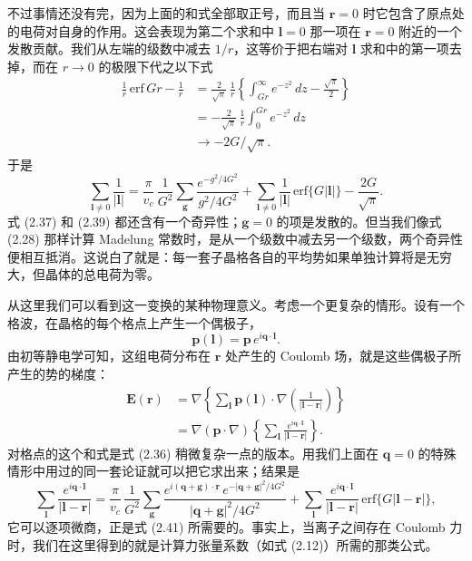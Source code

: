 不过事情还没有完，因为上面的和式全部取正号，而且当 $\mathbf{r}=0$ 时它包含了原点处的电荷对自身的作用。这会表现为第二个求和中 $\boldsymbol{l}=0$ 那一项在 $\mathbf{r}=0$ 附近的一个发散贡献。我们从左端的级数中减去 $1/r$，这等价于把右端对 $\boldsymbol{l}$ 求和中的第一项去掉，而在 $r\to 0$ 的极限下代之以下式
\begin{align*}
\frac{1}{r}\,\mathrm{erf}\,Gr - \frac{1}{r} &= \frac{2}{\sqrt{\pi}}\,\frac{1}{r}\left\{\int_{Gr}^{\infty} e^{-z^2}\, dz - \frac{\sqrt{\pi}}{2}\right\} \\
&= -\frac{2}{\sqrt{\pi}}\,\frac{1}{r}\int_0^{Gr} e^{-z^2}\, dz \\
&\to -2G/\sqrt{\pi}.
\tag{2.38}
\end{align*}
于是
\begin{equation*}
\sum_{\boldsymbol{l}\neq 0}\frac{1}{|\boldsymbol{l}|} = \frac{\pi}{v_c}\,\frac{1}{G^2}\sum_{\boldsymbol{g}}\frac{e^{-g^2/4G^2}}{g^2/4G^2} + \sum_{\boldsymbol{l}\neq 0}\frac{1}{|\boldsymbol{l}|}\,\mathrm{erf}\{G|\boldsymbol{l}|\} - \frac{2G}{\sqrt{\pi}}.
\tag{2.39}
\end{equation*}
式 (2.37) 和 (2.39) 都还含有一个奇异性；$\boldsymbol{g}=0$ 的项是发散的。但当我们像式 (2.28) 那样计算 Madelung 常数时，是从一个级数中减去另一个级数，两个奇异性便相互抵消。这说白了就是：每一套子晶格各自的平均势如果单独计算将是无穷大，但晶体的总电荷为零。

从这里我们可以看到这一变换的某种物理意义。考虑一个更复杂的情形。设有一个格波，在晶格的每个格点上产生一个偶极子，
\begin{equation*}
\mathbf{p}(\boldsymbol{l}) = \mathbf{p}\, e^{i\mathbf{q}\cdot\boldsymbol{l}}.
\tag{2.40}
\end{equation*}
由初等静电学可知，这组电荷分布在 $\mathbf{r}$ 处产生的 Coulomb 场，就是这些偶极子所产生的势的梯度：
\begin{align*}
\mathbf{E}(\mathbf{r}) &= \nabla\left\{\sum_{\boldsymbol{l}} \mathbf{p}(\boldsymbol{l})\cdot\nabla\left(\frac{1}{|\boldsymbol{l}-\mathbf{r}|}\right)\right\} \\
&= \nabla(\mathbf{p}\cdot\nabla)\left\{\sum_{\boldsymbol{l}} \frac{e^{i\mathbf{q}\cdot\boldsymbol{l}}}{|\boldsymbol{l}-\mathbf{r}|}\right\}.
\tag{2.41}
\end{align*}
对格点的这个和式是式 (2.36) 稍微复杂一点的版本。用我们上面在 $\mathbf{q}=0$ 的特殊情形中用过的同一套论证就可以把它求出来；结果是
\begin{equation*}
\sum_{\boldsymbol{l}} \frac{e^{i\mathbf{q}\cdot\boldsymbol{l}}}{|\boldsymbol{l}-\mathbf{r}|} = \frac{\pi}{v_c}\,\frac{1}{G^2}\sum_{\boldsymbol{g}} \frac{e^{i(\mathbf{q}+\boldsymbol{g})\cdot\mathbf{r}}\, e^{-|\mathbf{q}+\boldsymbol{g}|^2/4G^2}}{|\mathbf{q}+\boldsymbol{g}|^2/4G^2} + \sum_{\boldsymbol{l}} \frac{e^{i\mathbf{q}\cdot\boldsymbol{l}}}{|\boldsymbol{l}-\mathbf{r}|}\,\mathrm{erf}\{G|\boldsymbol{l}-\mathbf{r}|\},
\tag{2.42}
\end{equation*}
它可以逐项微商，正是式 (2.41) 所需要的。事实上，当离子之间存在 Coulomb 力时，我们在这里得到的就是计算力张量系数（如式 (2.12)）所需的那类公式。


